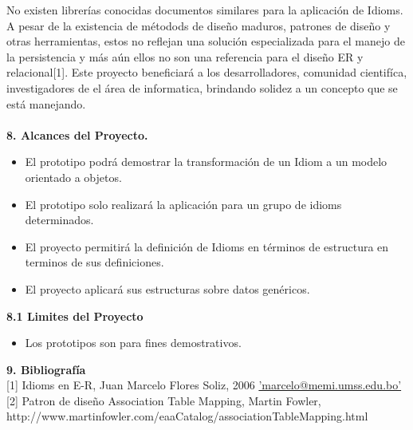 \documentclass[11pt]{article}
\begin{document}
\begin{flushleft}
No existen librerías conocidas documentos similares para la aplicación de Idioms.
A pesar de la existencia de métodods de diseño maduros, patrones de diseño y otras herramientas, estos no reflejan una solución especializada para el manejo de la persistencia y más aún ellos no son una referencia para el diseño ER y relacional[1].
Este proyecto beneficiará a los desarrolladores, comunidad cientifíca, investigadores de el área de informatica, brindando solidez a un concepto que se está manejando.\\
\\ \textbf{8. Alcances del Proyecto.}\\
\begin{itemize}
	\item El prototipo podrá demostrar la transformación de un Idiom a un modelo orientado a objetos.
	\item El prototipo solo realizará la aplicación para un grupo de idioms determinados.
	\item El proyecto permitirá la definición de Idioms en términos de estructura en terminos de sus definiciones.
	\item El proyecto aplicará sus estructuras sobre datos genéricos.
\end{itemize}
\textbf{8.1 Limites del Proyecto}
\begin{itemize}
	\item Los prototipos son para fines demostrativos.
\end{itemize}
\textbf{9. Bibliografía}\\
{[1] Idioms en E-R, Juan Marcelo Flores Soliz, 2006 \hyperref[marcelo@memi.umss.edu.bo]{'marcelo@memi.umss.edu.bo'}}\\
{[2] Patron de diseño Association Table Mapping, Martin Fowler, http://www.martinfowler.com/eaaCatalog/associationTableMapping.html}







\end{flushleft}
\end{document}
